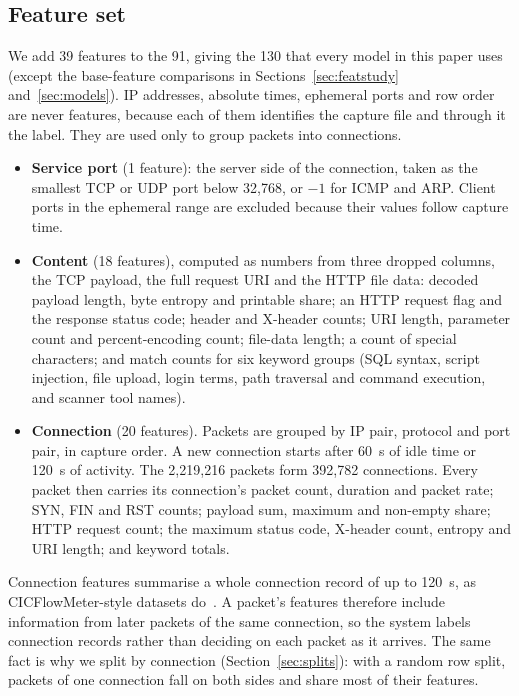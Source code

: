 \subsection{Feature set}
\label{sec:features}
We add 39 features to the 91, giving the 130 that every model in this paper uses (except the base-feature comparisons in Sections~\ref{sec:featstudy} and~\ref{sec:models}). IP addresses, absolute times, ephemeral ports and row order are never features, because each of them identifies the capture file and through it the label. They are used only to group packets into connections.
\begin{itemize}
  \item \textbf{Service port} (1 feature): the server side of the connection, taken as the smallest TCP or UDP port below 32,768, or $-1$ for ICMP and ARP. Client ports in the ephemeral range are excluded because their values follow capture time.
  \item \textbf{Content} (18 features), computed as numbers from three dropped columns, the TCP payload, the full request URI and the HTTP file data: decoded payload length, byte entropy and printable share; an HTTP request flag and the response status code; header and X-header counts; URI length, parameter count and percent-encoding count; file-data length; a count of special characters; and match counts for six keyword groups (SQL syntax, script injection, file upload, login terms, path traversal and command execution, and scanner tool names).
  \item \textbf{Connection} (20 features). Packets are grouped by IP pair, protocol and port pair, in capture order. A new connection starts after 60~s of idle time or 120~s of activity. The 2,219,216 packets form 392,782 connections. Every packet then carries its connection's packet count, duration and packet rate; SYN, FIN and RST counts; payload sum, maximum and non-empty share; HTTP request count; the maximum status code, X-header count, entropy and URI length; and keyword totals.
\end{itemize}
Connection features summarise a whole connection record of up to 120~s, as CICFlowMeter-style datasets do~\cite{sharafaldin2018}. A packet's features therefore include information from later packets of the same connection, so the system labels connection records rather than deciding on each packet as it arrives. The same fact is why we split by connection (Section~\ref{sec:splits}): with a random row split, packets of one connection fall on both sides and share most of their features.

